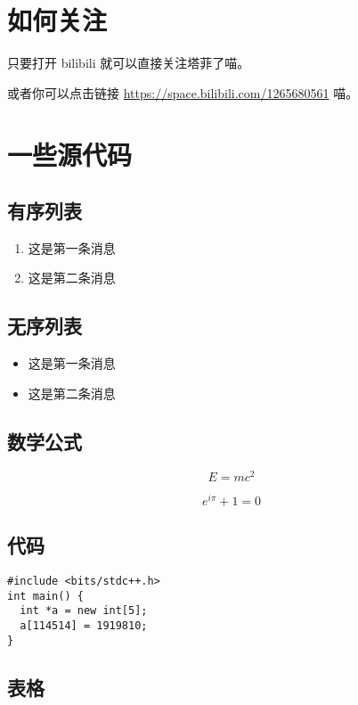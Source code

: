 \section{如何关注}

只要打开 bilibili 就可以直接关注塔菲了喵。

或者你可以点击链接 \url{https://space.bilibili.com/1265680561} 喵。

\section{一些源代码}

\subsection{有序列表}

\begin{enumerate}
  \item 这是第一条消息
  \item 这是第二条消息
\end{enumerate}

\subsection{无序列表}

\begin{itemize}
  \item 这是第一条消息
  \item 这是第二条消息
\end{itemize}

\subsection{数学公式}

$$
E = mc^2
$$

\begin{equation}
  e^{i\pi} + 1 = 0
\end{equation}

\subsection{代码}

\begin{verbatim}
#include <bits/stdc++.h>
int main() {
  int *a = new int[5];
  a[114514] = 1919810;
}
\end{verbatim}

\subsection{表格}

